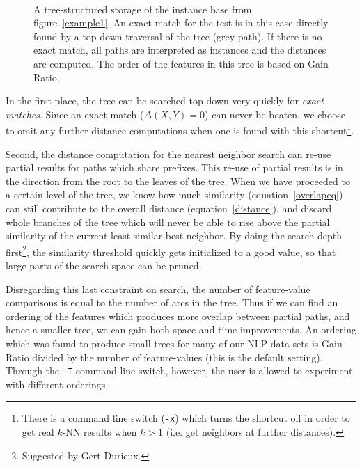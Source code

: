 \documentclass{report}
\begin{document}
\begin{figure}[htb]
        \begin{center}
                \leavevmode
                \epsfxsize=10cm
                \
                \caption{A tree-structured storage of the instance
                base from figure~\ref{example1}. An exact match for
                the test is in this case directly found by a top down
                traversal of the tree (grey path). If there is no
                exact match, all paths are interpreted as instances
                and the distances are computed. The order of the
                features in this tree is based on Gain Ratio.
                }
                \label{example2}
        \end{center}
\end{figure}


In the first place, the tree can be searched top-down very quickly for
{\em exact matches}. Since an exact match ($\Delta(X,Y)=0$) can never
be beaten, we choose to omit any further distance computations when
one is found with this shortcut\footnote{There is a command line
switch ({\tt -x}) which turns the shortcut off in order to get real $k$-NN
results when $k>1$ (i.e. get neighbors at further distances).}.

Second, the distance computation for the nearest neighbor search can
re-use partial results for paths which share prefixes.  This re-use of
partial results is in the direction from the root to the leaves of the
tree. When we have proceeded to a certain level of the tree, we know
how much similarity (equation~\ref{overlapeq}) can still contribute to
the overall distance (equation~\ref{distance}), and discard whole
branches of the tree which will never be able to rise above the
partial similarity of the current least similar best neighbor. By
doing the search depth first\footnote{Suggested by Gert Durieux.}, the
similarity threshold quickly gets initialized to a good value, so that
large parts of the search space can be pruned.

Disregarding this last constraint on search, the number of feature-value
comparisons is equal to the number of arcs in the tree. Thus if we can
find an ordering of the features which produces more overlap between
partial paths, and hence a smaller tree, we can gain both space and
time improvements. An ordering which was found to produce small trees
for many of our NLP data sets is Gain Ratio divided by the number of
feature-values (this is the default setting). Through the {\tt -T}
command line switch, however, the user is allowed to experiment with
different orderings.
\end{document}
